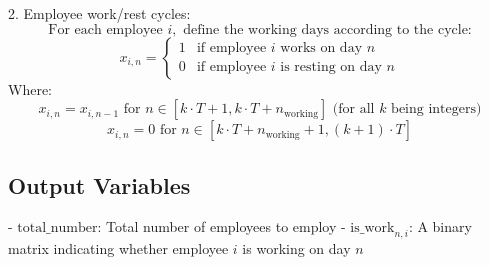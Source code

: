 \documentclass{article}
\begin{document}
2. Employee work/rest cycles:
\[
\text{For each employee } i, \text{ define the working days according to the cycle:}
\]
\[
x_{i, n} = 
\begin{cases} 
1 & \text{if employee } i \text{ works on day } n \\
0 & \text{if employee } i \text{ is resting on day } n 
\end{cases}
\]
Where:
\[
x_{i, n} = x_{i, n-1} \text{ for } n \in [k \cdot T + 1, k \cdot T + n_{\text{working}}] \text{ (for all } k \text{ being integers)}
\]
\[
x_{i, n} = 0 \text{ for } n \in [k \cdot T + n_{\text{working}} + 1, (k+1) \cdot T] 
\]

\subsection*{Output Variables}
- \( \text{total\_number} \): Total number of employees to employ
- \( \text{is\_work}_{n, i} \): A binary matrix indicating whether employee \( i \) is working on day \( n \)
\end{document}

